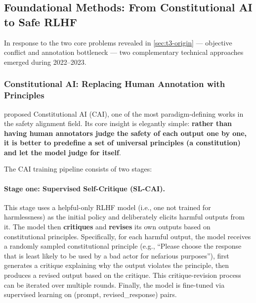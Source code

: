 
\subsection{Foundational Methods: From Constitutional AI to Safe RLHF}
\label{sec:t3-foundation}

In response to the two core problems revealed in \cref{sec:t3-origin} --- objective conflict and annotation bottleneck ---
two complementary technical approaches emerged during 2022--2023.

\subsubsection{Constitutional AI: Replacing Human Annotation with Principles}
\label{sec:t3-cai}

 proposed Constitutional AI (CAI), one of the most paradigm-defining works in the safety alignment field. Its core insight is elegantly simple:
\textbf{rather than having human annotators judge the safety of each output one by one,
it is better to predefine a set of universal principles (a constitution) and let the model judge for itself}.

The CAI training pipeline consists of two stages:

\paragraph{Stage one: Supervised Self-Critique (SL-CAI).}
This stage uses a helpful-only RLHF model (i.e., one not trained for harmlessness)
as the initial policy and deliberately elicits harmful outputs from it.
The model then \textbf{critiques} and \textbf{revises} its own outputs based on constitutional principles.
Specifically, for each harmful output, the model receives a randomly sampled constitutional principle
(e.g., ``Please choose the response that is least likely to be used by a bad actor for nefarious purposes''),
first generates a critique explaining why the output violates the principle,
then produces a revised output based on the critique.
This critique-revision process can be iterated over multiple rounds.
Finally, the model is fine-tuned via supervised learning on (prompt, revised\_response) pairs.

